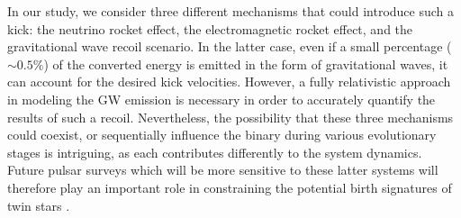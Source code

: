 \documentclass[main.tex]{subfiles}
\begin{document}
    In our study, we consider three different mechanisms that could introduce such a kick: the neutrino rocket effect, the electromagnetic rocket effect, and the gravitational wave recoil scenario. In the latter case, even if a small percentage ($\sim 0.5\%$) of the converted energy is emitted in the form of gravitational waves, it can account for the desired kick velocities. However, a fully relativistic approach in modeling the GW emission is necessary in order to accurately quantify the results of such a recoil.
    Nevertheless, the possibility that these three mechanisms could coexist, or sequentially influence the binary during various evolutionary stages is intriguing, as each contributes differently to the system dynamics.  
    Future pulsar surveys which will be more sensitive to these latter systems  will therefore play an important role in constraining the potential birth signatures of twin stars \citep{watts:2015, antoniadis:2021}.
    

    
\end{document}

